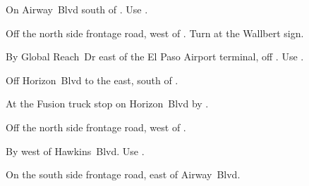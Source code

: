 
\begin{LocationList}

On Airway~Blvd south of .
Use  .

Off the north side  frontage road, west of .
Turn at the Wallbert sign.

By Global Reach~Dr east of the El Paso Airport terminal, off .
Use  .

\Location{\GarageHQ \Garage}
Off  Horizon~Blvd to the east, south of .

At the Fusion truck stop on  Horizon~Blvd by .

Off the north side  frontage road, west of .

By  west of Hawkins~Blvd.
Use  .

On the south side  frontage road, east of Airway~Blvd.

\end{LocationList}
